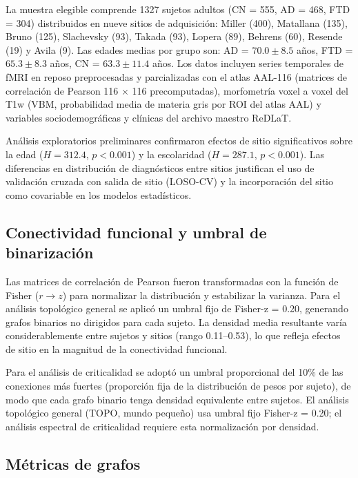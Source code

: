 \documentclass[12pt,a4paper]{article}
\begin{document}
La muestra elegible comprende 1327 sujetos adultos (CN = 555, AD = 468, FTD = 304) distribuidos
en nueve sitios de adquisición: Miller (400), Matallana (135), Bruno (125), Slachevsky (93),
Takada (93), Lopera (89), Behrens (60), Resende (19) y Avila (9). Las edades medias por grupo
son: AD = $70.0 \pm 8.5$ años, FTD = $65.3 \pm 8.3$ años, CN = $63.3 \pm 11.4$ años. Los datos
incluyen series temporales de fMRI en reposo preprocesadas y parcializadas con el atlas AAL-116
(matrices de correlación de Pearson 116 $\times$ 116 precomputadas), morfometría voxel a voxel
del T1w (VBM, probabilidad media de materia gris por ROI del atlas AAL) y variables
sociodemográficas y clínicas del archivo maestro ReDLaT.

Análisis exploratorios preliminares confirmaron efectos de sitio significativos sobre la edad
($H = 312.4$, $p < 0.001$) y la escolaridad ($H = 287.1$, $p < 0.001$). Las diferencias en
distribución de diagnósticos entre sitios justifican el uso de validación cruzada con salida de
sitio (LOSO-CV) y la incorporación del sitio como covariable en los modelos estadísticos.

\subsection{Conectividad funcional y umbral de binarización}

Las matrices de correlación de Pearson fueron transformadas con la función de Fisher ($r \to z$)
para normalizar la distribución y estabilizar la varianza. Para el análisis topológico general se
aplicó un umbral fijo de Fisher-z = 0.20, generando grafos binarios no dirigidos para cada
sujeto. La densidad media resultante varía considerablemente entre sujetos y sitios (rango
0.11--0.53), lo que refleja efectos de sitio en la magnitud de la conectividad funcional.

Para el análisis de criticalidad se adoptó un umbral proporcional del 10\% de las conexiones
más fuertes (proporción fija de la distribución de pesos por sujeto), de modo que cada grafo
binario tenga densidad equivalente entre sujetos. El análisis topológico general (TOPO, mundo
pequeño) usa umbral fijo Fisher-z = 0.20; el análisis espectral de criticalidad requiere esta
normalización por densidad.

\subsection{Métricas de grafos}
\label{sec:topo}
\end{document}
